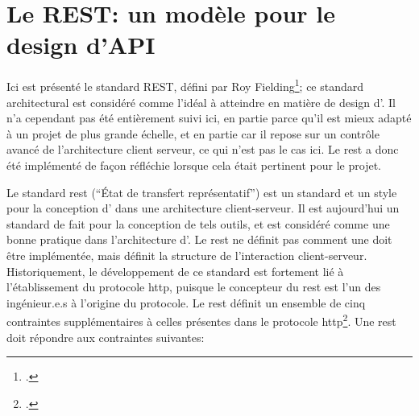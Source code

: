 \section{Le REST: un modèle pour le design d'API}
Ici est présenté le standard REST, défini par Roy Fielding\footcite{fielding_architectural_2000}; ce standard architectural est considéré comme l'idéal à atteindre en matière de design d'\api{}. Il n'a cependant pas été entièrement suivi ici, en partie parce qu'il est mieux adapté à un projet de plus grande échelle, et en partie car il repose sur un contrôle avancé de l'architecture client serveur, ce qui n'est pas le cas ici. Le \gls{rest} a donc été implémenté de façon réfléchie lorsque cela était pertinent pour le projet.

Le standard \gls{rest} (\enquote{État de transfert représentatif}) est un standard et un style pour la conception d'\api{} dans une architecture client-serveur. Il est aujourd'hui un standard de fait pour la conception de tels outils, et est considéré comme une bonne pratique dans l'architecture d'\api{}. Le \gls{rest} ne définit pas comment une \api{} doit être implémentée, mais définit la structure de l'interaction client-serveur. Historiquement, le développement de ce standard est fortement lié à l'établissement du protocole \gls{http}, puisque le concepteur du \gls{rest} est l'un des ingénieur.e.s à l'origine du protocole. Le \gls{rest} définit un ensemble de cinq contraintes supplémentaires à celles présentes dans le protocole \gls{http}\footcite[p. 94]{fielding_architectural_2000}. Une \api{} \gls{rest} doit répondre aux contraintes suivantes:

